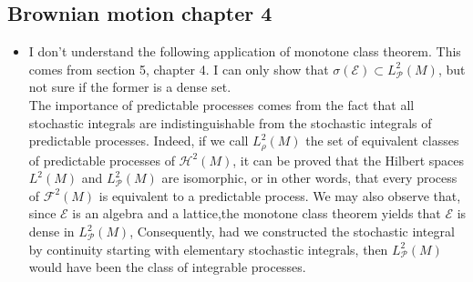 \subsection{Brownian motion chapter 4}
\begin{itemize}
	\item I don't understand the following application of monotone class theorem. This comes from section 5, chapter 4. I can only show that $ \sigma(\mathscr{E}) \subset L_{\mathscr{P}}^{2}(M) $, but not sure if the former is a dense set.\\
	The importance of predictable processes comes from the fact that all stochastic integrals are indistinguishable from the stochastic integrals of predictable processes. Indeed, if we call $L_{\rho}^{2}(M)$ the set of equivalent classes of predictable processes of $\mathscr{H}^{2}(M)$, it can be proved that the Hilbert spaces $L^{2}(M)$ and $L_{\mathscr{P}}^{2}(M)$ are isomorphic, or in other words, that every process of $\mathscr{F}^{2}(M)$ is equivalent to a predictable process. We may also observe that, since $\mathscr{E}$ is an algebra and a lattice,the monotone class theorem yields that $\mathscr{E}$ is dense in $L_{\mathscr{P}}^{2}(M)$,  Consequently, had we constructed the stochastic integral by continuity starting with elementary stochastic integrals, then $L_{\mathscr{P}}^{2}(M)$ would have been the class of integrable processes.
\end{itemize}
